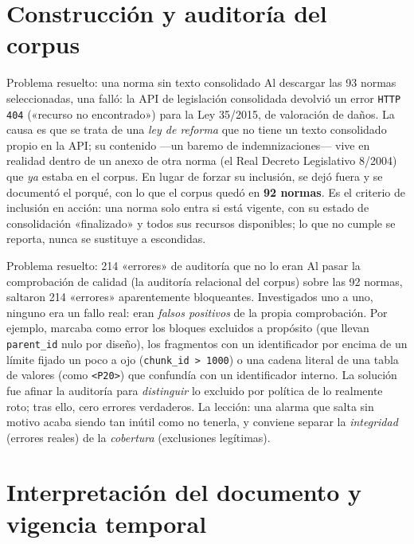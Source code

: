 \section{Construcción y auditoría del corpus}

\begin{myredbox}{Problema resuelto: una norma sin texto consolidado}
Al descargar las 93 normas seleccionadas, una falló: la API de legislación consolidada devolvió un error \texttt{HTTP 404} («recurso no encontrado») para la Ley 35/2015, de valoración de daños. La causa es que se trata de una \emph{ley de reforma} que no tiene un texto consolidado propio en la API; su contenido —un baremo de indemnizaciones— vive en realidad dentro de un anexo de otra norma (el Real Decreto Legislativo 8/2004) que \emph{ya} estaba en el corpus. En lugar de forzar su inclusión, se dejó fuera y se documentó el porqué, con lo que el corpus quedó en \textbf{92 normas}. Es el criterio de inclusión en acción: una norma solo entra si está vigente, con su estado de consolidación «finalizado» y todos sus recursos disponibles; lo que no cumple se reporta, nunca se sustituye a escondidas.
\end{myredbox}

\begin{myredbox}{Problema resuelto: 214 «errores» de auditoría que no lo eran}
Al pasar la comprobación de calidad (la auditoría relacional del corpus) sobre las 92 normas, saltaron 214 «errores» aparentemente bloqueantes. Investigados uno a uno, ninguno era un fallo real: eran \emph{falsos positivos} de la propia comprobación. Por ejemplo, marcaba como error los bloques excluidos a propósito (que llevan \texttt{parent\_id} nulo por diseño), los fragmentos con un identificador por encima de un límite fijado un poco a ojo (\texttt{chunk\_id > 1000}) o una cadena literal de una tabla de valores (como \texttt{<P20>}) que confundía con un identificador interno. La solución fue afinar la auditoría para \emph{distinguir} lo excluido por política de lo realmente roto; tras ello, cero errores verdaderos. La lección: una alarma que salta sin motivo acaba siendo tan inútil como no tenerla, y conviene separar la \emph{integridad} (errores reales) de la \emph{cobertura} (exclusiones legítimas).
\end{myredbox}

\section{Interpretación del documento y vigencia temporal}

